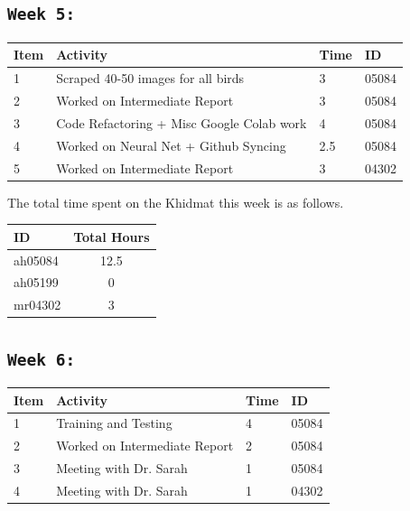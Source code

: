 \documentclass[11pt]{article}
\begin{document}
\subsection{\texttt{Week 5: }}
\begin{center}
\begin{tabular}{|l|l|l|l|}
  \hline
  \textbf{Item} 	& \textbf{Activity} & \textbf{Time} & \textbf{ID} \\\hline
    1 & Scraped 40-50 images for all birds & 3 & 05084 \\ \hline
    2 & Worked on Intermediate Report & 3 & 05084 \\ \hline
    3 & Code Refactoring + Misc Google Colab work & 4 & 05084 \\ \hline
    4 & Worked on Neural Net + Github Syncing & 2.5 & 05084 \\ \hline
    5 & Worked on Intermediate Report & 3 & 04302 \\ \hline
\end{tabular}
    
\end{center}
The total time spent on the Khidmat this week is as follows.    
\begin{center}
\begin{tabular}{|l|c|}
  \hline
  \textbf{ID} & \textbf{Total Hours}\\\hline
  ah05084 & 12.5 \\\hline
  ah05199 & 0 \\\hline
  mr04302 & 3 \\\hline
\end{tabular}
\end{center}
\newpage

\subsection{\texttt{Week 6: }}
\begin{center}
\begin{tabular}{|l|l|l|l|}
  \hline
  \textbf{Item} 	& \textbf{Activity} & \textbf{Time} & \textbf{ID} \\\hline
  1 & Training and Testing & 4 & 05084  \\ \hline
  2 & Worked on Intermediate Report & 2 & 05084 \\ \hline
  3 & Meeting with Dr. Sarah & 1 & 05084 \\ \hline
  4 & Meeting with Dr. Sarah & 1 & 04302 \\ \hline
  
\end{tabular}
    
\end{center}
\end{document}
